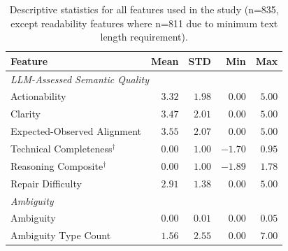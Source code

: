 \begin{table}[h]
    \centering
    \caption{Descriptive statistics for all features used in the study (n=835, except readability features where n=811 due to minimum text length requirement).}
    \footnotesize
    \label{tab:feature_stats}
    \begin{tabular}{lrrrr}
    \toprule
    \textbf{Feature} & \textbf{Mean} & \textbf{STD} & \textbf{Min} & \textbf{Max} \\
    \midrule
    
    \multicolumn{5}{l}{\textit{LLM-Assessed Semantic Quality}} \\
    Actionability                       & $3.32$ & $1.98$ & $0.00$ & $5.00$ \\
    Clarity                             & $3.47$ & $2.01$ & $0.00$ & $5.00$ \\
    Expected-Observed Alignment         & $3.55$ & $2.07$ & $0.00$ & $5.00$ \\
    Technical Completeness$^\dagger$    & $0.00$ & $1.00$ & $-1.70$ & $0.95$ \\
    Reasoning Composite$^\dagger$       & $0.00$ & $1.00$ & $-1.89$ & $1.78$ \\
    Repair Difficulty                   & $2.91$ & $1.38$ & $0.00$ & $5.00$ \\
    
    \midrule
    \multicolumn{5}{l}{\textit{Ambiguity}} \\
    Ambiguity                           & $0.00$ & $0.01$ & $0.00$ & $0.05$ \\
    Ambiguity Type Count                & $1.56$ & $2.55$ & $0.00$ & $7.00$ \\
    

\end{tabular}
\end{table}
